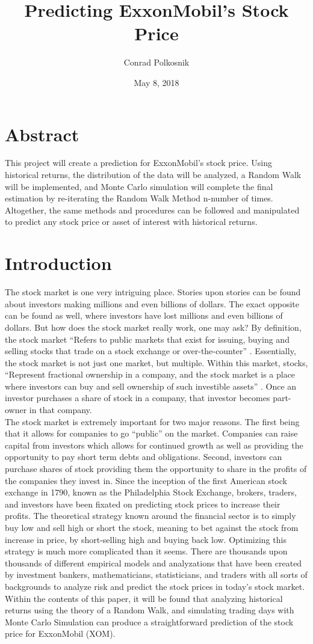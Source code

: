 \documentclass{article}
\title{Predicting ExxonMobil's Stock Price}
\author{Conrad Polkosnik }
\date{May 8, 2018}
\begin{document}
\maketitle
\section{Abstract}
This project will create a prediction for ExxonMobil's stock price. Using historical returns, the distribution of the data will be analyzed, a Random Walk will be implemented, and Monte Carlo simulation will complete the final estimation by re-iterating the Random Walk Method n-number of times. Altogether, the same methods and procedures can be followed and manipulated to predict any stock price or asset of interest with historical returns.
\newpage
\section{Introduction}
The stock market is one very intriguing place. Stories upon stories can be found about investors making millions and even billions of dollars. The exact opposite can be found as well, where investors have lost millions and even billions of dollars. But how does the stock market really work, one may ask? By definition, the stock market “Refers to public markets that exist for issuing, buying and selling stocks that trade on a stock exchange or over-the-counter” \cite{CFI}. Essentially, the stock market is not just one market, but multiple. Within this market, stocks, “Represent fractional ownership in a company, and the stock market is a place where investors can buy and sell ownership of such investible assets” \cite{CFI}. Once an investor purchases a share of stock in a company, that investor becomes part-owner in that company.
\\
The stock market is extremely important for two major reasons. The first being that it allows for companies to go “public” on the market. Companies can raise capital from investors which allows for continued growth as well as providing the opportunity to pay short term debts and obligations. Second, investors can purchase shares of stock providing them the opportunity to share in the profits of the companies they invest in. Since the inception of the first American stock exchange in 1790, known as the Philadelphia Stock Exchange, brokers, traders, and investors have been fixated on predicting stock prices to increase their profits. The theoretical strategy known around the financial sector is to simply buy low and sell high or short the stock, meaning to bet against the stock from increase in price, by short-selling high and buying back low. Optimizing this strategy is much more complicated than it seems. There are thousands upon thousands of different empirical models and analyzations that have been created by investment bankers, mathematicians, statisticians, and traders with all sorts of backgrounds to analyze risk and predict the stock prices in today’s stock market. Within the contents of this paper, it will be found that analyzing historical returns using the theory of a Random Walk, and simulating trading days with Monte Carlo Simulation can produce a straightforward prediction of the stock price for ExxonMobil (XOM).
\end{document}
